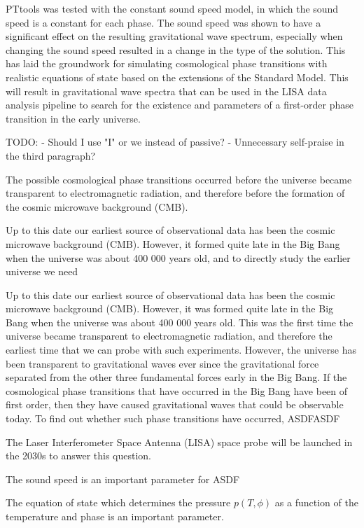 PTtools was tested with the constant sound speed model, in which the sound speed is a constant for each phase.
The sound speed was shown to have a significant effect on the resulting gravitational wave spectrum,
especially when changing the sound speed resulted in a change in the type of the solution.
This has laid the groundwork for simulating cosmological phase transitions with realistic equations of state based on the extensions of the Standard Model.
This will result in gravitational wave spectra that can be used in the LISA data analysis pipeline to search for the existence and parameters of a first-order phase transition in the early universe.

TODO:
- Should I use "I" or we instead of passive?
- Unnecessary self-praise in the third paragraph?


\iffalse
The possible cosmological phase transitions occurred before the universe became transparent to electromagnetic radiation,
and therefore before the formation of the cosmic microwave background (CMB).

Up to this date our earliest source of observational data has been the cosmic microwave background (CMB).
However, it formed quite late in the Big Bang when the universe was about 400 000 years old,
and to directly study the earlier universe we need

Up to this date our earliest source of observational data has been the cosmic microwave background (CMB).
However, it was formed quite late in the Big Bang when the universe was about 400 000 years old.
This was the first time the universe became transparent to electromagnetic radiation,
and therefore the earliest time that we can probe with such experiments.
However, the universe has been transparent to gravitational waves ever since the gravitational force separated from the other three fundamental forces early in the Big Bang.
If the cosmological phase transitions that have occurred in the Big Bang have been of first order,
then they have caused gravitational waves that could be observable today.
To find out whether such phase transitions have occurred,
ASDFASDF

The Laser Interferometer Space Antenna (LISA) space probe will be launched in the 2030s to answer this question.

The sound speed is an important parameter for ASDF

The equation of state which determines the pressure $p(T,\phi)$ as a function of the temperature and phase is an important parameter.

